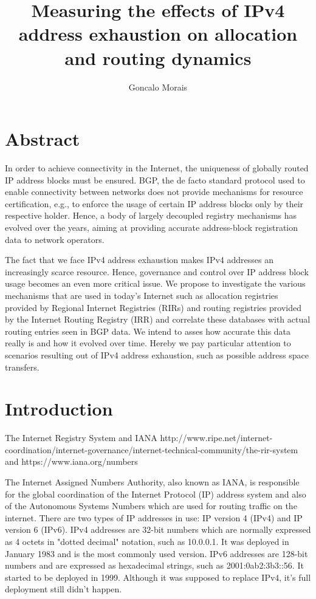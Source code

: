 \documentclass[11pt]{report}
\title{\textbf{Measuring the effects of IPv4 address exhaustion on allocation and routing dynamics}}
\author{Goncalo Morais}
\date{}
\begin{document}
\maketitle
\section{Abstract}
In order to achieve connectivity in the Internet, the uniqueness of
globally routed IP address blocks must be ensured. BGP, the de facto
standard protocol used to enable connectivity between networks does not
provide mechanisms for resource certification, e.g., to enforce the
usage of certain IP address blocks only by their respective holder.
Hence, a body of largely decoupled registry mechanisms has evolved over
the years, aiming at providing accurate address-block registration data
to network operators.

The fact that we face IPv4 address exhaustion makes IPv4 addresses an
increasingly scarce resource. Hence, governance and control over IP
address block usage becomes an even more critical issue. We propose to
investigate the various mechanisms that are used in today's Internet
such as allocation registries provided by Regional Internet Registries
(RIRs) and routing registries provided by the Internet Routing Registry
(IRR) and correlate these databases with actual routing entries seen in
BGP data. We intend to asses how accurate this data really is and how it
evolved over time. Hereby we pay particular attention to scenarios
resulting out of IPv4 address exhaustion, such as possible address space
transfers.

\section{Introduction}
The Internet Registry System and IANA http://www.ripe.net/internet-coordination/internet-governance/internet-technical-community/the-rir-system and https://www.iana.org/numbers

The Internet Assigned Numbers Authority, also known as IANA, is responsible for the global coordination of the Internet Protocol (IP) address system and also of the Autonomous Systems Numbers which are used for routing traffic on the internet. There are two types of IP addresses in use: IP version 4 (IPv4) and IP version 6 (IPv6). IPv4 addresses are 32-bit numbers which are normally expressed as 4 octets in "dotted decimal" notation, such as 10.0.0.1. It was deployed in January 1983 and is the most commonly used version. IPv6 addresses are 128-bit numbers and are expressed as hexadecimal strings, such as 2001:0ab2:3b3::56. It started to be deployed in 1999. Although it was supposed to replace IPv4, it's full deployment still didn't happen. 
\end{document}
